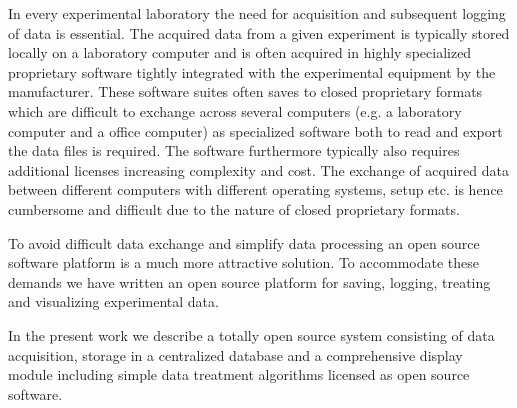 In every experimental laboratory the need for acquisition and subsequent
logging of data is essential. The acquired data from a given
experiment is typically stored locally on a laboratory computer and is often
acquired in highly specialized proprietary software tightly integrated with the
experimental equipment by the manufacturer. These software suites often saves
to closed proprietary formats which are difficult to exchange across several
computers (e.g. a laboratory computer and a office computer) as specialized
software both to read and export the data files is required. The software
furthermore typically also requires additional licenses increasing complexity
and cost. The exchange of acquired data between different computers with
different operating systems, setup etc. is hence cumbersome and difficult due
to the nature of closed proprietary formats.

To avoid difficult data exchange and simplify data processing an open source
software platform is a much more attractive
solution\cite{Benn2009,Murray2011,So2007}. To accommodate these demands we have
written an open source platform for saving, logging, treating and visualizing
experimental data.

In the present work we describe a totally open source system consisting of data
acquisition, storage in a centralized database and a comprehensive display
module including simple data treatment algorithms licensed as open source
software.
